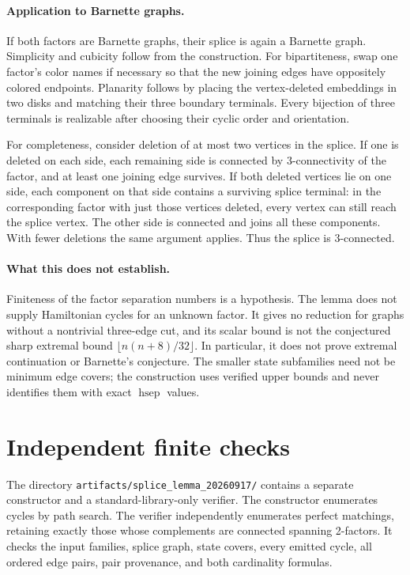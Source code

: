 \documentclass[10pt]{article}
\newcommand{\hsep}{\operatorname{hsep}}
\begin{document}
\paragraph{Application to Barnette graphs.}
If both factors are Barnette graphs, their splice is again a Barnette graph.
Simplicity and cubicity follow from the construction. For bipartiteness, swap
one factor's color names if necessary so that the new joining edges have
oppositely colored endpoints. Planarity follows by placing the vertex-deleted
embeddings in two disks and matching their three boundary terminals. Every
bijection of three terminals is realizable after choosing their cyclic order
and orientation.

For completeness, consider deletion of at most two vertices in the splice.
If one is deleted on each side, each remaining side is connected by
3-connectivity of the factor, and at least one joining edge survives.
If both deleted vertices lie on one side, each component on that side contains
a surviving splice terminal: in the corresponding factor with just those
vertices deleted, every vertex can still reach the splice vertex.
The other side is connected and joins all these components. With fewer
deletions the same argument applies. Thus the splice is 3-connected.

\paragraph{What this does not establish.}
Finiteness of the factor separation numbers is a hypothesis. The lemma does
not supply Hamiltonian cycles for an unknown factor. It gives no reduction
for graphs without a nontrivial three-edge cut, and its scalar bound is not
the conjectured sharp extremal bound $\lfloor n(n+8)/32\rfloor$.
In particular, it does not prove extremal continuation or Barnette's conjecture.
The smaller state subfamilies need not be minimum edge covers; the construction
uses verified upper bounds and never identifies them with exact $\hsep$ values.

\clearpage
\section{Independent finite checks}
The directory \texttt{artifacts/splice\_lemma\_20260917/} contains a separate
constructor and a standard-library-only verifier. The constructor enumerates
cycles by path search. The verifier independently enumerates perfect matchings,
retaining exactly those whose complements are connected spanning 2-factors.
It checks the input families, splice graph, state covers, every emitted cycle,
all ordered edge pairs, pair provenance, and both cardinality formulas.
\end{document}
